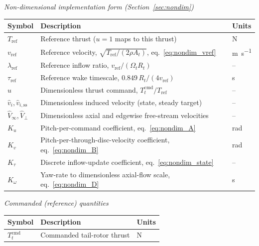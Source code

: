 \documentclass[11pt,a4paper]{article}
\newcommand{\OmegaT}{\Omega_t}
\newcommand{\Rt}{R_t}
\newcommand{\At}{A_t}
\newcommand{\Tcmd}{T_t^{\text{cmd}}}
\begin{document}
\vspace{0.5em}
\noindent\textit{Non-dimensional implementation form (Section~\ref{sec:nondim})}
\begin{center}
\renewcommand{\arraystretch}{1.12}
\begin{tabular}{@{}l l l@{}}
\toprule
Symbol & Description & Units \\
\midrule
\(T_{\text{ref}}\)     & Reference thrust (\(u=1\) maps to this thrust) & \si{\newton}\\
\(v_{\text{ref}}\)     & Reference velocity, \(\sqrt{T_{\text{ref}}/(2\rho\At)}\), eq.~\eqref{eq:nondim_vref} & \si{\metre\per\second}\\
\(\lambda_{\text{ref}}\) & Reference inflow ratio, \(v_{\text{ref}}/(\OmegaT\Rt)\) & --\\
\(\tau_{\text{ref}}\)  & Reference wake timescale, \(0.849\,\Rt/(4 v_{\text{ref}})\) & \si{\second}\\
\(u\)                  & Dimensionless thrust command, \(\Tcmd/T_{\text{ref}}\) & --\\
\(\hat{v}_i,\hat{v}_{i,\text{ss}}\) & Dimensionless induced velocity (state, steady target) & --\\
\(\hat{V}_\infty,\hat{V}_\perp\) & Dimensionless axial and edgewise free-stream velocities & --\\
\(K_u\) & Pitch-per-command coefficient, eq.~\eqref{eq:nondim_A} & \si{\radian}\\
\(K_v\) & Pitch-per-through-disc-velocity coefficient, eq.~\eqref{eq:nondim_B} & \si{\radian}\\
\(K_\tau\) & Discrete inflow-update coefficient, eq.~\eqref{eq:nondim_state} & --\\
\(K_\omega\) & Yaw-rate to dimensionless axial-flow scale, eq.~\eqref{eq:nondim_D} & \si{\second}\\
\bottomrule
\end{tabular}
\end{center}

\vspace{0.5em}
\noindent\textit{Commanded (reference) quantities}
\begin{center}
\renewcommand{\arraystretch}{1.12}
\begin{tabular}{@{}l l l@{}}
\toprule
Symbol & Description & Units \\
\midrule
\(\Tcmd\)              & Commanded tail-rotor thrust                   & \si{\newton}\\
\bottomrule
\end{tabular}
\end{center}
\end{document}
